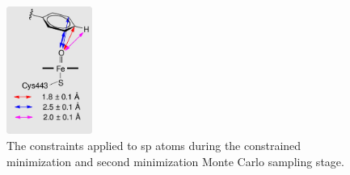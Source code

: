 \begin{figure}[hp]
\centering
\includegraphics[width=0.25\textwidth]{figures/idsite/34b}
\caption{The constraints applied to sp atoms during the constrained minimization and second minimization Monte Carlo sampling stage.}
\label{figure:second_sp2_constraints}
\end{figure}
